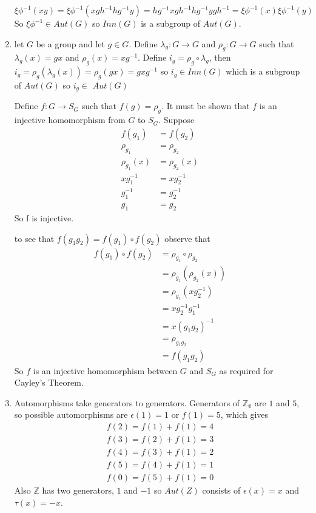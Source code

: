 \documentclass{amsart}
\begin{document}
\begin{enumerate}
    $\xi\phi^{-1}(xy)=\xi\phi^{-1}(xgh^{-1}hg^{-1}y)=hg^{-1}xgh^{-1}hg^{-1}ygh^{-1}=\xi\phi^{-1}(x)\xi\phi^{-1}(y)$ So  $\xi\phi^{-1}\in Aut(G)$ so $Inn(G)$ is a subgroup of $Aut(G)$.
    
    \item let $G$ be a group and let $g\in G$.  Define $\lambda_g:G\to G$ and $\rho_g:G\to G$ such that $\lambda_g(x)=gx$ and $\rho_g(x)=xg^{-1}$.  Define $i_g=\rho_g\circ \lambda_g$, then $i_g=\rho_g(\lambda_g(x))=\rho_g(gx)=gxg^{-1}$ so $i_g\in Inn(G)$ which is a subgroup of $Aut(G)$ so $i_g\in $ $Aut(G)$
    
    Define $f:G\to S_G$ such that $f(g)=\rho_g$.  It must be shown that $f$ is an injective homomorphism from $G$ to $S_G$.  Suppose \begin{align*}
        f(g_1)&=f(g_2) \\
        \rho_g_1&=\rho_g_2 \\
        \rho_g_1(x)&=\rho_g_2(x) \\
        xg_1^{-1}&=xg_2^{-1} \\
        g_1^{-1}&=g_2^{-1} \\
        g_1&=g_2
    \end{align*}
    So f is injective.
    
    to see that $f(g_1g_2)=f(g_1)\circ f(g_2)$ observe that \begin{align*}
    f(g_1)\circ f(g_2)&=\rho_g_1 \circ \rho_g_2 \\
    &=\rho_g_1(\rho_g_2(x)) \\
    &=\rho_g_1(xg_2^{-1}) \\
    &=xg_2^{-1}g_1^{-1} \\
    &=x(g_1g_2)^{-1} \\
    &=\rho_{g_1g_2} \\
    &=f(g_1g_2)
    \end{align*}
    So $f$ is an injective homomorphism between $G$ and $S_G$ as required for Cayley's Theorem.
    
    \item Automorphisms take generators to generators.  Generators of $\mathbb{Z_6}$ are $1$ and $5$, so possible automorphisms are $\epsilon(1)=1$ or $f(1)=5$, which gives \begin{align*}
        f(2)=f(1)+f(1)=4 \\
        f(3)=f(2)+f(1)=3 \\
        f(4)=f(3)+f(1)=2 \\
        f(5)=f(4)+f(1)=1 \\
        f(0)=f(5)+f(1)=0
    \end{align*}
    Also $\mathbb{Z}$ has two generators, $1$ and $-1$ so $Aut(Z)$ consists of $\epsilon(x)=x$ and $\tau(x)=-x$.
\end{enumerate}
\end{document}
